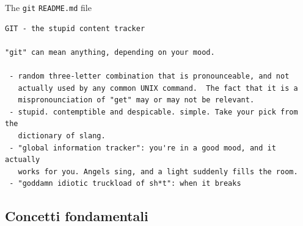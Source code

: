 \documentclass[presentation]{beamer}
\begin{document}
\begin{frame}[fragile]{The \texttt{git} \texttt{README.md} file}
	\begin{block}{}
		\begin{Verbatim}[fontsize=\footnotesize]
GIT - the stupid content tracker

"git" can mean anything, depending on your mood.

 - random three-letter combination that is pronounceable, and not
   actually used by any common UNIX command.  The fact that it is a
   mispronounciation of "get" may or may not be relevant.
 - stupid. contemptible and despicable. simple. Take your pick from the
   dictionary of slang.
 - "global information tracker": you're in a good mood, and it actually
   works for you. Angels sing, and a light suddenly fills the room. 
 - "goddamn idiotic truckload of sh*t": when it breaks
		\end{Verbatim}
	\end{block}
\end{frame}


\subsection{Concetti fondamentali}
\end{document}
